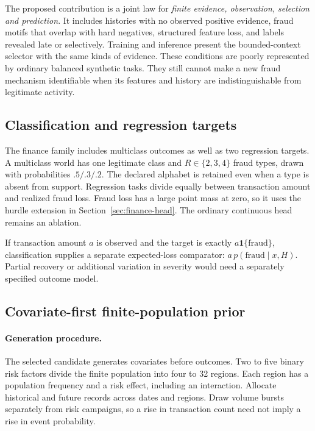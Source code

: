 \documentclass[11pt]{article}
\newcommand{\ind}{\mathbf{1}}
\begin{document}
The proposed contribution is a joint law for \emph{finite evidence, observation, selection and prediction}. It includes histories with no observed positive evidence, fraud motifs that overlap with hard negatives, structured feature loss, and labels revealed late or selectively. Training and inference present the bounded-context selector with the same kinds of evidence. These conditions are poorly represented by ordinary balanced synthetic tasks. They still cannot make a new fraud mechanism identifiable when its features and history are indistinguishable from legitimate activity.

\subsection{Classification and regression targets}

The finance family includes multiclass outcomes as well as two regression targets. A multiclass world has one legitimate class and $R\in\{2,3,4\}$ fraud types, drawn with probabilities $.5/.3/.2$. The declared alphabet is retained even when a type is absent from support. Regression tasks divide equally between transaction amount and realized fraud loss. Fraud loss has a large point mass at zero, so it uses the hurdle extension in Section~\ref{sec:finance-head}. The ordinary continuous head remains an ablation.

If transaction amount $a$ is observed and the target is exactly $a\ind\{\mathrm{fraud}\}$, classification supplies a separate expected-loss comparator: $a\,p(\mathrm{fraud}\mid x,H)$. Partial recovery or additional variation in severity would need a separately specified outcome model.

\subsection{Covariate-first finite-population prior}
\label{sec:risk-partition}

\paragraph{Generation procedure.}
The selected candidate generates covariates before outcomes. Two to five binary risk factors divide the finite population into four to 32 regions. Each region has a population frequency and a risk effect, including an interaction. Allocate historical and future records across dates and regions. Draw volume bursts separately from risk campaigns, so a rise in transaction count need not imply a rise in event probability.
\end{document}
